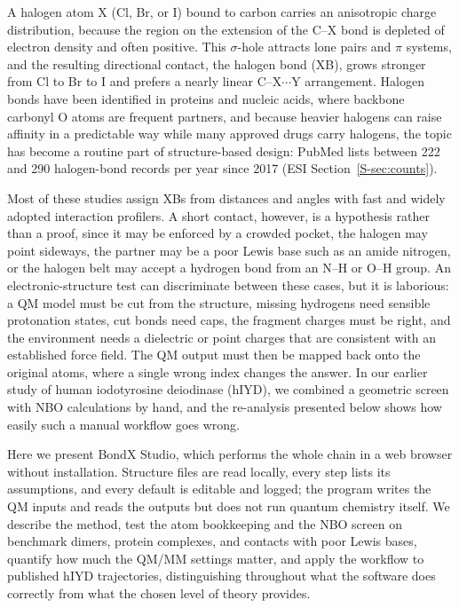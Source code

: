 \documentclass[journal=jcisd8,manuscript=article,layout=two-column]{achemso}
\newcommand{\BX}{BondX Studio}
\begin{document}
A halogen atom X (Cl, Br, or I) bound to carbon carries an anisotropic charge distribution, because the region on the extension of the C--X bond is depleted of electron density and often positive. This $\sigma$-hole attracts lone pairs and $\pi$ systems, and the resulting directional contact, the halogen bond (XB), grows stronger from Cl to Br to I and prefers a nearly linear C--X$\cdots$Y arrangement.\cite{Clark2007,Desiraju2013,Cavallo2016,KolarHobza2016} Halogen bonds have been identified in proteins and nucleic acids, where backbone carbonyl O atoms are frequent partners,\cite{Auffinger2004,Voth2009,Scholfield2013,Sirimulla2013} and because heavier halogens can raise affinity in a predictable way while many approved drugs carry halogens,\cite{Lu2009,Wilcken2013,Hardegger2011,Smith2014,BenedettoTiz2022} the topic has become a routine part of structure-based design: PubMed lists between 222 and 290 halogen-bond records per year since 2017 (ESI Section~\ref{S-sec:counts}).\cite{PubMed2026}

Most of these studies assign XBs from distances and angles with fast and widely adopted interaction profilers.\cite{Salentin2015,Adasme2021,Jubb2017,Bouysset2021,Young2022} A short contact, however, is a hypothesis rather than a proof, since it may be enforced by a crowded pocket, the halogen may point sideways, the partner may be a poor Lewis base such as an amide nitrogen, or the halogen belt may accept a hydrogen bond from an N--H or O--H group. An electronic-structure test can discriminate between these cases, but it is laborious: a QM model must be cut from the structure, missing hydrogens need sensible protonation states, cut bonds need caps, the fragment charges must be right, and the environment needs a dielectric or point charges that are consistent with an established force field. The QM output must then be mapped back onto the original atoms, where a single wrong index changes the answer. In our earlier study of human iodotyrosine deiodinase (hIYD), we combined a geometric screen with NBO calculations by hand,\cite{Karmakar2026} and the re-analysis presented below shows how easily such a manual workflow goes wrong.

Here we present \BX{}, which performs the whole chain in a web browser without installation. Structure files are read locally, every step lists its assumptions, and every default is editable and logged; the program writes the QM inputs and reads the outputs but does not run quantum chemistry itself. We describe the method, test the atom bookkeeping and the NBO screen on benchmark dimers, protein complexes, and contacts with poor Lewis bases, quantify how much the QM/MM settings matter, and apply the workflow to published hIYD trajectories, distinguishing throughout what the software does correctly from what the chosen level of theory provides.
\end{document}
